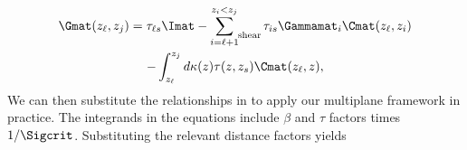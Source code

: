 \begin{multline}
\Gmat(z_\ell, z_j) = \tau_{\ell s}\Imat - \sum\limits_{i =\ell +1}^{z_i < z_j}\mathop{}_{\mkern-5mu \rm{shear}} \tau_{is} \Gammamat_i \Cmat(z_\ell, z_i) \\
- \int_{z_\ell}^{z_j} d\kappa(z) \tau(z, z_s) \Cmat(z_\ell, z),
\end{multline}
We can then substitute the relationships in  to apply our multiplane framework in practice. The integrands in the equations include $\beta$ and $\tau$ factors times $1/\Sigcrit$. Substituting the relevant distance factors yields